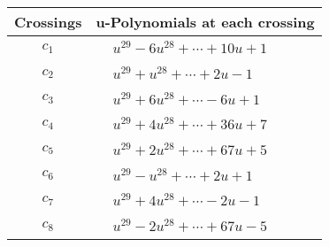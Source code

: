\documentclass[1p]{elsarticle_modified}
\theoremstyle{definition}
\begin{document}
\begin{tabular}{m{50pt}|m{274pt}}
Crossings & \hspace{64pt}u-Polynomials at each crossing \\
\hline $$\begin{aligned}c_{1}\end{aligned}$$&$\begin{aligned}
&u^{29}-6 u^{28}+\cdots+10 u+1
\end{aligned}$\\
\hline $$\begin{aligned}c_{2}\end{aligned}$$&$\begin{aligned}
&u^{29}+u^{28}+\cdots+2 u-1
\end{aligned}$\\
\hline $$\begin{aligned}c_{3}\end{aligned}$$&$\begin{aligned}
&u^{29}+6 u^{28}+\cdots-6 u+1
\end{aligned}$\\
\hline $$\begin{aligned}c_{4}\end{aligned}$$&$\begin{aligned}
&u^{29}+4 u^{28}+\cdots+36 u+7
\end{aligned}$\\
\hline $$\begin{aligned}c_{5}\end{aligned}$$&$\begin{aligned}
&u^{29}+2 u^{28}+\cdots+67 u+5
\end{aligned}$\\
\hline $$\begin{aligned}c_{6}\end{aligned}$$&$\begin{aligned}
&u^{29}- u^{28}+\cdots+2 u+1
\end{aligned}$\\
\hline $$\begin{aligned}c_{7}\end{aligned}$$&$\begin{aligned}
&u^{29}+4 u^{28}+\cdots-2 u-1
\end{aligned}$\\
\hline $$\begin{aligned}c_{8}\end{aligned}$$&$\begin{aligned}
&u^{29}-2 u^{28}+\cdots+67 u-5
\end{aligned}$\\

\end{tabular}
\end{document}
